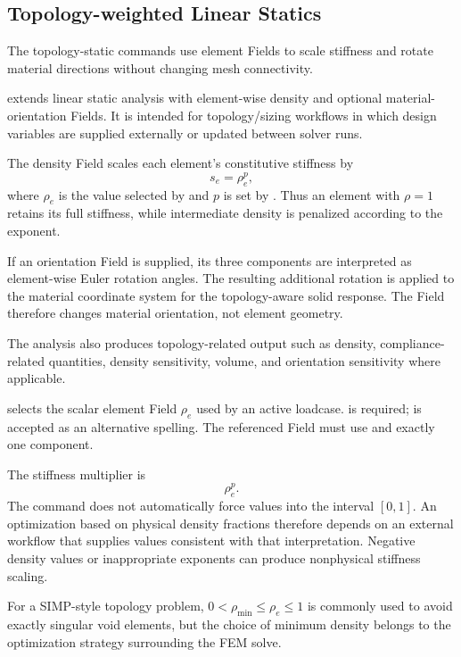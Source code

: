 \subsection{Topology-weighted Linear Statics}
\label{sec:advanced-features}

The topology-static commands use element Fields to scale stiffness and rotate material directions without changing mesh connectivity.

 extends linear static analysis with element-wise density and optional material-orientation Fields. It is intended for topology/sizing workflows in which design variables are supplied externally or updated between solver runs.

The density Field scales each element's constitutive stiffness by
\[
s_e=\rho_e^p,
\]
where \(\rho_e\) is the value selected by  and \(p\) is set by . Thus an element with \(\rho=1\) retains its full stiffness, while intermediate density is penalized according to the exponent.

If an orientation Field is supplied, its three components are interpreted as element-wise Euler rotation angles. The resulting additional rotation is applied to the material coordinate system for the topology-aware solid response. The Field therefore changes material orientation, not element geometry.

The analysis also produces topology-related output such as density, compliance-related quantities, density sensitivity, volume, and orientation sensitivity where applicable.


 selects the scalar element Field \(\rho_e\) used by an active  loadcase.  is required;  is accepted as an alternative spelling. The referenced Field must use  and exactly one component.

The stiffness multiplier is
\[
\rho_e^p.
\]
The command does not automatically force values into the interval \([0,1]\). An optimization based on physical density fractions therefore depends on an external workflow that supplies values consistent with that interpretation. Negative density values or inappropriate exponents can produce nonphysical stiffness scaling.

For a SIMP-style topology problem, \(0<\rho_\mathrm{min}\leq\rho_e\leq1\) is commonly used to avoid exactly singular void elements, but the choice of minimum density belongs to the optimization strategy surrounding the FEM solve.

